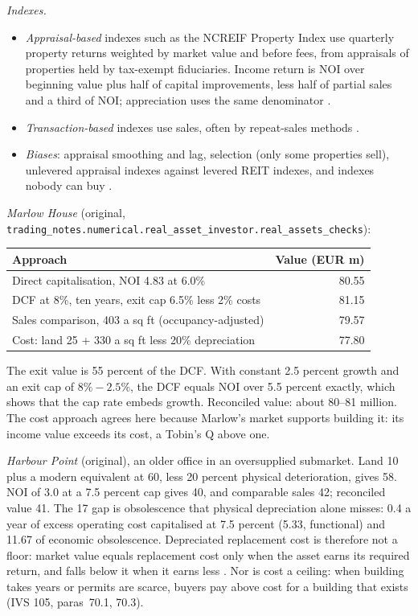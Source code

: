 \begin{qfmethod}
\emph{Indexes.}
\begin{itemize}
\item \emph{Appraisal-based} indexes such as the NCREIF Property Index use quarterly property returns weighted by market value and before fees, from appraisals of properties held by tax-exempt fiduciaries. Income return is NOI over beginning value plus half of capital improvements, less half of partial sales and a third of NOI; appreciation uses the same denominator \citep[p.~3]{ncreif-npi-2026q2}.
\item \emph{Transaction-based} indexes use sales, often by repeat-sales methods \citep[p.~18]{tsolacos-real-estate-2021}.
\item \emph{Biases}: appraisal smoothing and lag, selection (only some properties sell), unlevered appraisal indexes against levered REIT indexes, and indexes nobody can buy \citep[pp.~377--378, 427--428]{s7-ang}.
\end{itemize}

 \emph{Marlow House} (original, \nolinkurl{trading_notes.numerical.real_asset_investor.real_assets_checks}):
\begin{center}\small
\begin{tabular}{@{}lr@{}}
\toprule
Approach & Value (EUR m) \\
\midrule
Direct capitalisation, NOI 4.83 at 6.0\% & 80.55 \\
DCF at 8\%, ten years, exit cap 6.5\% less 2\% costs & 81.15 \\
Sales comparison, 403 a sq ft (occupancy-adjusted) & 79.57 \\
Cost: land 25 + 330 a sq ft less 20\% depreciation & 77.80 \\
\bottomrule
\end{tabular}
\end{center}
The exit value is 55 percent of the DCF. With constant 2.5 percent growth and an exit cap of $8\%-2.5\%$, the DCF equals NOI over 5.5 percent exactly, which shows that the cap rate embeds growth. Reconciled value: about 80--81 million. The cost approach agrees here because Marlow's market supports building it: its income value exceeds its cost, a Tobin's Q above one.

\emph{Harbour Point} (original), an older office in an oversupplied submarket. Land 10 plus a modern equivalent at 60, less 20 percent physical deterioration, gives 58. NOI of 3.0 at a 7.5 percent cap gives 40, and comparable sales 42; reconciled value 41. The 17 gap is obsolescence that physical depreciation alone misses: 0.4 a year of excess operating cost capitalised at 7.5 percent (5.33, functional) and 11.67 of economic obsolescence. Depreciated replacement cost is therefore not a floor: market value equals replacement cost only when the asset earns its required return, and falls below it when it earns less \citep[pp.~537--538]{investment-valuation-2012}. Nor is cost a ceiling: when building takes years or permits are scarce, buyers pay above cost for a building that exists (IVS 105, paras~70.1, 70.3).


\end{qfmethod}
